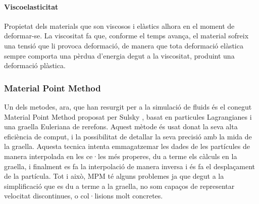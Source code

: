 \documentclass[a4paper]{report}
\begin{document}
	\paragraph{Viscoelasticitat} Propietat dels materials que son viscosos i elàstics alhora en el moment de deformar-se. La viscositat fa que, conforme el temps avança, el material sofreix una tensió que li provoca deformació, de manera que tota deformació elàstica sempre comporta una pèrdua d'energia degut a la viscositat, produint una deformació plàstica.
	\subsubsection[MPM]{Material Point Method}
	Un dels metodes, ara, que han resurgit per a la simulació de fluids és el conegut Material Point Method proposat per Sulsky \cite{Sulsky1995}, basat en particules Lagrangianes i una graella Euleriana de rerefons. Aquest mètode és usat donat la seva alta eficiència de comput, i la possibilitat de detallar la seva precisió amb la mida de la graella. \newline
	Aquesta tecnica intenta emmagatzemar les dades de les partícules de manera interpolada en les ce·les més properes, du a terme els càlculs en la graella, i finalment es fa la interpolació de manera inversa i és fa el desplaçament de la partícula. \newline
	Tot i això, MPM té alguns problemes ja que degut a la simplificació que es du a terme a la graella, no som capaços de representar velocitat discontinues, o col·lisions molt concretes. 
	
\end{document}
